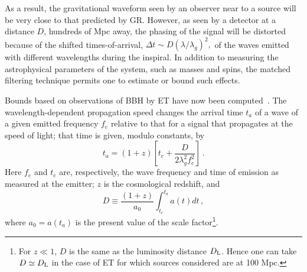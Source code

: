 As a result, the gravitational waveform seen by an observer near to a
source will be very close to that predicted by GR.
However, as seen by a detector at a distance $D$, hundreds 
of Mpc away, the phasing of the signal will be distorted because of 
the shifted times-of-arrival, $\Delta t \sim D(\lambda/\lambda_g)^2,$ 
of the waves emitted with different wavelengths during the inspiral.   
In addition to measuring the astrophysical parameters of the system, 
such as masses and spins, the matched filtering technique permits one 
to estimate or bound such effects.

Bounds based on observations of BBH by ET have now been computed~\cite{AW09}. 
The wavelength-dependent 
propagation speed changes the arrival time $t_a$ of a wave of a given emitted 
frequency $f_e$ relative to that for a signal that propagates at the speed 
of light; that time is given, modulo constants, by
\begin{equation}
t_a = (1+z) \left [ t_e + \frac{D}{2\lambda_g^2 f_e^2} \right ] \,.
\label{time}
\end{equation}
Here $f_e$ and $t_e$ are, respectively, the wave frequency and time of 
emission as measured at the emitter; $z$ is the cosmological redshift, and
\begin{equation}
D \equiv \frac{(1+z)}{a_0}\int_{t_e}^{t_a} a(t) dt \,,
\label{D}
\end{equation}
where $a_0=a(t_a)$ is the present value of the scale factor\footnote{For 
$z\ll1$, $D$ is the same as the luminosity distance $D_{\rm L}$. Hence one 
can take $D\simeq D_{\rm L}$ in the case of ET for which sources considered 
are at 100 Mpc.}.  
